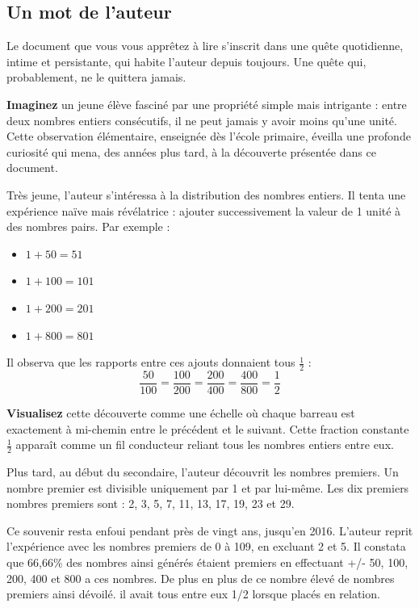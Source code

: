 \documentclass[a4paper,11pt]{article}
\newenvironment{resume}{%
    \begin{tcolorbox}[colback=purple!5,colframe=holpurple,title={\textbf{Résumé visuel}}]
}{%
    \end{tcolorbox}
}
\begin{document}
\subsection{Un mot de l'auteur}

Le document que vous vous apprêtez à lire s'inscrit dans une quête quotidienne, intime et persistante, qui habite l'auteur depuis toujours. Une quête qui, probablement, ne le quittera jamais.

\begin{resume}
\textbf{Imaginez} un jeune élève fasciné par une propriété simple mais intrigante : entre deux nombres entiers consécutifs, il ne peut jamais y avoir moins qu'une unité. Cette observation élémentaire, enseignée dès l'école primaire, éveilla une profonde curiosité qui mena, des années plus tard, à la découverte présentée dans ce document.
\end{resume}

Très jeune, l'auteur s'intéressa à la distribution des nombres entiers. Il tenta une expérience naïve mais révélatrice : ajouter successivement la valeur de 1 unité à des nombres pairs. Par exemple :
\begin{itemize}
    \item $1 + 50 = 51$
    \item $1 + 100 = 101$
    \item $1 + 200 = 201$
    \item $1 + 800 = 801$
\end{itemize}

Il observa que les rapports entre ces ajouts donnaient tous $\frac{1}{2}$ :
\[
\frac{50}{100} = \frac{100}{200} = \frac{200}{400} = \frac{400}{800} = \frac{1}{2}
\]

\begin{resume}
\textbf{Visualisez} cette découverte comme une échelle où chaque barreau est exactement à mi-chemin entre le précédent et le suivant. Cette fraction constante $\frac{1}{2}$ apparaît comme un fil conducteur reliant tous les nombres entiers entre eux.
\end{resume}

Plus tard, au début du secondaire, l'auteur découvrit les nombres premiers. Un nombre premier est divisible uniquement par 1 et par lui-même. Les dix premiers nombres premiers sont : 2, 3, 5, 7, 11, 13, 17, 19, 23 et 29.

Ce souvenir resta enfoui pendant près de vingt ans, jusqu'en 2016. L'auteur reprit l'expérience avec les nombres premiers de 0 à 109, en excluant 2 et 5. Il constata que 66,66\% des nombres ainsi générés étaient premiers en effectuant +/- 50, 100, 200,
 400 et 800 a ces nombres. De plus en plus de ce nombre élevé de nombres premiers ainsi dévoilé. il avait tous entre eux 1/2 lorsque placés en relation.
\end{document}
